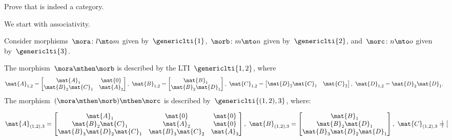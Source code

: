 \begin{exercise}
    Prove that \LTI is indeed a category.
\end{exercise}
\begin{solution}
    We start with associativity.

    Consider morphisms~$\mora \colon l\mto m$ given by~$\genericlti{1}$,~$\morb\colon m\mto n$ given by~$\genericlti{2}$, and~$\morc\colon n\mto o$ given by~$\genericlti{3}$.

    The morphism~$\mora\mthen \morb$ is described by the LTI~$\genericlti{1,2}$, where
    \begin{equation}
        \mat{A}_{1,2}=\begin{bmatrix}
            \mat{A}_1          & \mat{0}   \\
            \mat{B}_2\mat{C}_1 & \mat{A}_2
        \end{bmatrix},\
        \mat{B}_{1,2}=\begin{bmatrix}
            \mat{B}_1 \\
            \mat{B}_2\mat{D}_1
        \end{bmatrix},\
        \mat{C}_{1,2}=\begin{bmatrix}
            \mat{D}_2\mat{C}_1 & \mat{C}_2
        \end{bmatrix}, \
        \mat{D}_{1,2}=\mat{D}_2\mat{D}_1.
    \end{equation}
    The morphism~$(\mora\mthen \morb)\mthen \morc$ is described by~$\genericlti{(1,2),3}$, where:
    \begin{widepar}
        \begin{equation}
            \label{eq:assoc_lti_1}
            \mat{A}_{(1,2),3}=\begin{bmatrix}
                \mat{A}_1                   & \mat{0}            & \mat{0}   \\
                \mat{B}_2\mat{C}_1          & \mat{A}_2          & \mat{0}   \\
                \mat{B}_3\mat{D}_2\mat{C}_1 & \mat{B}_3\mat{C}_2 & \mat{A}_3
            \end{bmatrix},\
            \mat{B}_{(1,2),3}=\begin{bmatrix}
                \mat{B}_1          \\
                \mat{B}_2\mat{D}_1 \\
                \mat{B}_3\mat{D}_2\mat{D}_1
            \end{bmatrix},\
            \mat{C}_{(1,2),3}=\begin{bmatrix}

\end{bmatrix}
\end{equation}
\end{widepar}
\end{solution}
